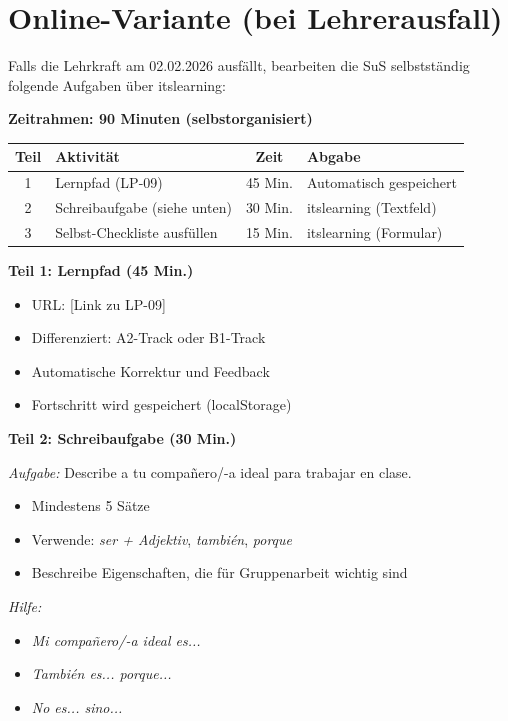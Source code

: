 \documentclass[11pt,a4paper]{article}
\begin{document}
\section{Online-Variante (bei Lehrerausfall)}

\begin{onlinebox}
Falls die Lehrkraft am 02.02.2026 ausfällt, bearbeiten die SuS selbstständig folgende Aufgaben über itslearning:

\vspace{1em}
\textbf{Zeitrahmen: 90 Minuten (selbstorganisiert)}

\begin{tabular}{|c|p{5cm}|c|p{5cm}|}
\hline
\textbf{Teil} & \textbf{Aktivität} & \textbf{Zeit} & \textbf{Abgabe} \\
\hline
1 & Lernpfad (LP-09) & 45 Min. & Automatisch gespeichert \\
\hline
2 & Schreibaufgabe (siehe unten) & 30 Min. & itslearning (Textfeld) \\
\hline
3 & Selbst-Checkliste ausfüllen & 15 Min. & itslearning (Formular) \\
\hline
\end{tabular}

\vspace{1em}
\textbf{Teil 1: Lernpfad (45 Min.)}
\begin{itemize}
    \item URL: [Link zu LP-09]
    \item Differenziert: A2-Track oder B1-Track
    \item Automatische Korrektur und Feedback
    \item Fortschritt wird gespeichert (localStorage)
\end{itemize}

\vspace{1em}
\textbf{Teil 2: Schreibaufgabe (30 Min.)}

\textit{Aufgabe:} \glqq{}Describe a tu compañero/-a ideal para trabajar en clase.\grqq{}

\begin{itemize}
    \item Mindestens 5 Sätze
    \item Verwende: \textit{ser + Adjektiv}, \textit{también}, \textit{porque}
    \item Beschreibe Eigenschaften, die für Gruppenarbeit wichtig sind
\end{itemize}

\textit{Hilfe:}
\begin{itemize}
    \item \textit{Mi compañero/-a ideal es...}
    \item \textit{También es... porque...}
    \item \textit{No es... sino...}
\end{itemize}


\end{onlinebox}
\end{document}
